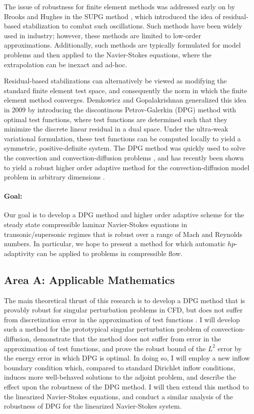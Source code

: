 \documentclass[12pt,letterpaper,oneside]{article}
\begin{document}
The issue of robustness for finite element methods was addressed early on by Brooks and Hughes in the SUPG method \cite{SUPG}, which introduced the idea of residual-based stabilization to combat such oscillations. Such methods have been widely used in industry; however, these methods are limited to low-order approximations. Additionally, such methods are typically formulated for model problems and then applied to the Navier-Stokes equations, where the extrapolation can be inexact and ad-hoc.  

Residual-based stabilizations can alternatively be viewed as modifying the standard finite element test space, and consequently the norm in which the finite element method converges. Demkowicz and Gopalakrishnan generalized this idea in 2009 by introducing the discontinous Petrov-Galerkin (DPG) method with optimal test functions, where test functions are determined such that they minimize the discrete linear residual in a dual space.  Under the ultra-weak variational formulation, these test functions can be computed locally to yield a symmetric, positive-definite system.  The DPG method was quickly used to solve the convection and convection-diffusion problems \cite{DPG1,DPG2,DPG3}, and has recently been shown to yield a robust higher order adaptive method for the convection-diffusion model problem in arbitrary dimensions \cite{DPGrobustness,DPGrobustness2}.  

\paragraph{Goal:} Our goal is to develop a DPG method and higher order adaptive scheme for the steady state compressible laminar Navier-Stokes equations in transonic/supersonic regimes that is robust over a range of Mach and Reynolds numbers. In particular, we hope to present a method for which automatic $hp$-adaptivity can be applied to problems in compressible flow.  

\subsection*{Area A: Applicable Mathematics}

The main theoretical thrust of this research is to develop a DPG method that is provably robust for singular perturbation problems in CFD, but does not suffer from discretization error in the approximation of test functions \cite{DPGrobustness, DPGrobustness2}.  I will develop such a method for the prototypical singular perturbation problem of convection-diffusion, demonstrate that the method does not suffer from error in the approximation of test functions, and prove the robust bound of the $L^2$ error by the energy error in which DPG is optimal.  In doing so, I will employ a new inflow boundary condition which, compared to standard Dirichlet inflow conditions, induces more well-behaved solutions to the adjoint problem, and describe the effect upon the robustness of the DPG method.  I will then extend this method to the linearized Navier-Stokes equations, and conduct a similar analysis of the robustness of DPG for the linearized Navier-Stokes system.  
\end{document}
